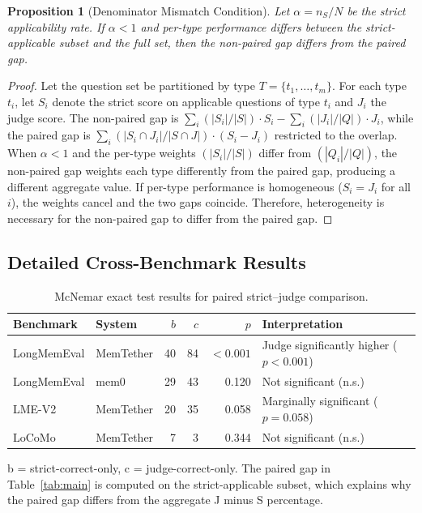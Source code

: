 \documentclass[10pt]{article}
\newtheorem{proposition}{Proposition}
\begin{document}
\begin{proposition}[Denominator Mismatch Condition]
Let $\alpha = n_S / N$ be the strict applicability rate. If $\alpha < 1$ and per-type performance differs between the strict-applicable subset and the full set, then the non-paired gap differs from the paired gap.
\end{proposition}
\begin{proof}
Let the question set be partitioned by type $T = \{t_1, \ldots, t_m\}$. For each type $t_i$, let $S_i$ denote the strict score on applicable questions of type $t_i$ and $J_i$ the judge score. The non-paired gap is $\sum_i (|S_i|/|S|) \cdot S_i - \sum_i (|J_i|/|Q|) \cdot J_i$, while the paired gap is $\sum_i (|S_i \cap J_i|/|S \cap J|) \cdot (S_i - J_i)$ restricted to the overlap. When $\alpha < 1$ and the per-type weights $(|S_i|/|S|)$ differ from $(|Q_i|/|Q|)$, the non-paired gap weights each type differently from the paired gap, producing a different aggregate value. If per-type performance is homogeneous ($S_i = J_i$ for all $i$), the weights cancel and the two gaps coincide. Therefore, heterogeneity is necessary for the non-paired gap to differ from the paired gap.
\end{proof}

\subsection{Detailed Cross-Benchmark Results}

\begin{table}[h]
\centering
\caption{McNemar exact test results for paired strict--judge comparison.}
\label{tab:mcnemar}
\begin{tabular}{llrrrl}
\toprule
Benchmark & System & $b$ & $c$ & $p$ & Interpretation \\
\midrule
LongMemEval & MemTether & 40 & 84 & $<0.001$ & Judge significantly higher ($p<0.001$) \\
LongMemEval & mem0 & 29 & 43 & 0.120 & Not significant (n.s.) \\
LME-V2 & MemTether & 20 & 35 & 0.058 & Marginally significant ($p=0.058$) \\
LoCoMo & MemTether & 7 & 3 & 0.344 & Not significant (n.s.) \\
\bottomrule
\end{tabular}
\vspace{2mm}
\footnotesize{b = strict-correct-only, c = judge-correct-only. The paired gap in Table~\ref{tab:main} is computed on the strict-applicable subset, which explains why the paired gap differs from the aggregate J minus S percentage.}
\end{table}
\end{document}
